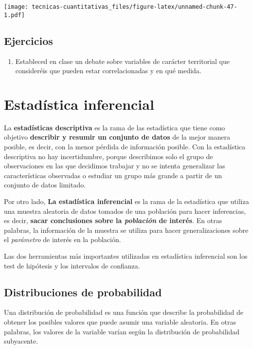 \documentclass[
]{book}
\providecommand{\tightlist}{%
  \setlength{\itemsep}{0pt}\setlength{\parskip}{0pt}}
\begin{document}
\texttt{[image: tecnicas-cuantitativas\_files/figure-latex/unnamed-chunk-47-1.pdf]}

\hypertarget{ejercicios-1}{%
\section{Ejercicios}\label{ejercicios-1}}

\begin{enumerate}
\def\labelenumi{\arabic{enumi}.}
\tightlist
\item
  Estableced en clase un debate sobre variables de carácter territorial que consideréis que pueden estar correlacionadas y en qué medida.
\end{enumerate}

\hypertarget{estaduxedstica-inferencial}{%
\chapter{Estadística inferencial}\label{estaduxedstica-inferencial}}

La \textbf{estadísticas descriptiva} es la rama de las estadística que tiene como objetivo \textbf{describir y resumir un conjunto de datos} de la mejor manera posible, es decir, con la menor pérdida de información posible. Con la estadística descriptiva no hay incertidumbre, porque describimos solo el grupo de observaciones en las que decidimos trabajar y no se intenta generalizar las características observadas o estudiar un grupo más grande a partir de un conjunto de datos limitado.

Por otro lado, \textbf{La estadística inferencial} es la rama de la estadística que utiliza una muestra aleatoria de datos tomados de una población para hacer inferencias, es decir, \textbf{sacar conclusiones sobre la \emph{población} de interés}. En otras palabras, la información de la muestra se utiliza para hacer generalizaciones sobre el \emph{parámetro} de interés en la población.

Las dos herramientas más importantes utilizadas en estadística inferencial son los test de hipótesis y los intervalos de confianza.

\hypertarget{distribuciones-de-probabilidad}{%
\section{Distribuciones de probabilidad}\label{distribuciones-de-probabilidad}}

Una distribución de probabilidad es una función que describe la probabilidad de obtener los posibles valores que puede asumir una variable aleatoria. En otras palabras, los valores de la variable varían según la distribución de probabilidad subyacente.
\end{document}
